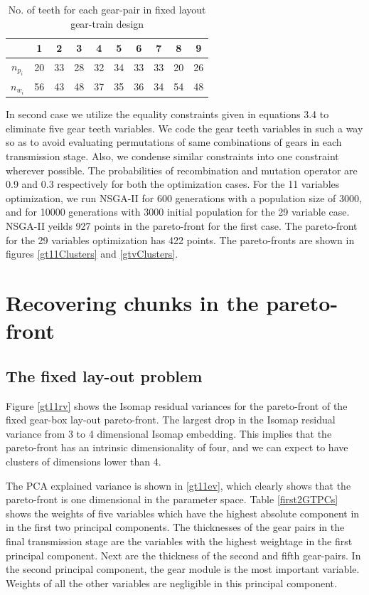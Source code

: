 \begin{table}[!ht]
\centering
\begin{tabular}{c|c|c|c|c|c|c|c|c|c|}
\cline{2-10}
& 1 & 2 & 3 & 4 & 5 & 6 & 7 & 8 & 9  \\
\hline
\multicolumn{1}{|c|}{$n_{p_i}$} & 20 & 33 & 28 & 32 & 34 & 33 & 33 & 20 & 26\\
\hline
\multicolumn{1}{|c|}{$n_{w_i}$} & 56 & 43 & 48 & 37 & 35 & 36 & 34 & 54 & 48\\
\hline
\end{tabular}
\caption{No. of teeth for each gear-pair in fixed layout gear-train design}
\label{gearTeeth}
\end{table}

In second case we utilize the equality constraints given in equations 3.4
to eliminate five gear teeth variables. We code the gear teeth variables in
such a way so as to avoid evaluating permutations of same combinations of
gears in each transmission stage. Also, we condense similar constraints
into one constraint wherever possible. The probabilities of recombination
and mutation operator are 0.9 and 0.3 respectively for both the
optimization cases. For the 11 variables optimization, we run NSGA-II for
600 generations with a population size of 3000, and for 10000 generations
with 3000 initial population for the 29 variable case. NSGA-II yeilds 927
points in the pareto-front for the first case. The pareto-front for the 29
variables optimization has 422 points. The pareto-fronts are shown in
figures \ref{gt11Clusters} and \ref{gtvClusters}.


\section{Recovering chunks in the pareto-front}

\subsection{The fixed lay-out problem}
Figure \ref{gt11rv} shows the Isomap residual variances for the
pareto-front of the fixed gear-box lay-out pareto-front. The largest drop
in the Isomap residual variance from 3 to 4 dimensional Isomap
embedding. This implies that the pareto-front has an intrinsic
dimensionality of four, and we can expect to have clusters of dimensions
lower than 4.

The PCA explained variance is shown in \ref{gt11ev}, which clearly shows
that the pareto-front is one dimensional in the parameter space. Table
\ref{first2GTPCs} shows the weights of five variables which have the
highest absolute component in in the first two principal components. The
thicknesses of the gear pairs in the final transmission stage are the
variables with the highest weightage in the first principal component. Next
are the thickness of the second and fifth gear-pairs. In the second
principal component, the gear module is the most important
variable. Weights of all the other variables are  negligible in this
principal component.


